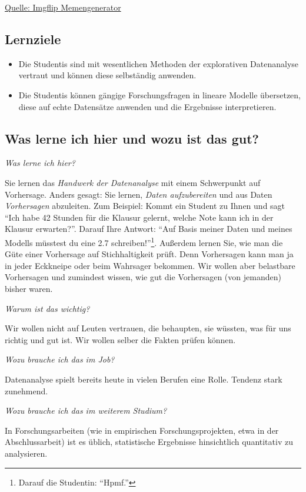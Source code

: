 \documentclass[
  a4paper,
]{scrbook}
\theoremstyle{definition}
\theoremstyle{definition}
\theoremstyle{definition}
\theoremstyle{remark}
\begin{document}
\href{https://imgflip.com/memegenerator}{Quelle: Imgflip Memengenerator}

\subsection{Lernziele}\label{lernziele}

\begin{itemize}
\item
  Die Studentis sind mit wesentlichen Methoden der explorativen
  Datenanalyse vertraut und können diese selbständig anwenden.
\item
  Die Studentis können gängige Forschungsfragen in lineare Modelle
  übersetzen, diese auf echte Datensätze anwenden und die Ergebnisse
  interpretieren.
\end{itemize}

\subsection{Was lerne ich hier und wozu ist das
gut?}\label{was-lerne-ich-hier-und-wozu-ist-das-gut}

\emph{Was lerne ich hier?}

Sie lernen das \emph{Handwerk der Datenanalyse} mit einem Schwerpunkt
auf Vorhersage. Anders gesagt: Sie lernen, \emph{Daten aufzubereiten}
und aus Daten \emph{Vorhersagen} abzuleiten. Zum Beispiel: Kommt ein
Student zu Ihnen und sagt ``Ich habe 42 Stunden für die Klausur gelernt,
welche Note kann ich in der Klausur erwarten?''. Darauf Ihre Antwort:
``Auf Basis meiner Daten und meines Modells müsstest du eine 2.7
schreiben!''\footnote{Darauf die Studentin: ``Hpmf.''}. Außerdem lernen
Sie, wie man die Güte einer Vorhersage auf Stichhaltigkeit prüft. Denn
Vorhersagen kann man ja in jeder Eckkneipe oder beim Wahrsager bekommen.
Wir wollen aber belastbare Vorhersagen und zumindest wissen, wie gut die
Vorhersagen (von jemanden) bisher waren.

\emph{Warum ist das wichtig?}

Wir wollen nicht auf Leuten vertrauen, die behaupten, sie wüssten, was
für uns richtig und gut ist. Wir wollen selber die Fakten prüfen können.

\emph{Wozu brauche ich das im Job?}

Datenanalyse spielt bereits heute in vielen Berufen eine Rolle. Tendenz
stark zunehmend.

\emph{Wozu brauche ich das im weiterem Studium?}

In Forschungsarbeiten (wie in empirischen Forschungsprojekten, etwa in
der Abschlussarbeit) ist es üblich, statistische Ergebnisse hinsichtlich
quantitativ zu analysieren.
\end{document}
